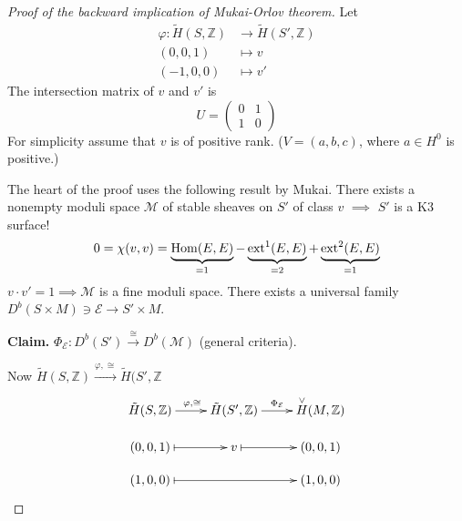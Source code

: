 \begin{proof}[Proof of the backward implication of Mukai-Orlov theorem]
Let 
\begin{align*}
\varphi: \tilde{H}(S,\mathbb{Z}) &\longrightarrow \tilde{H}(S',\mathbb{Z}) \\
(0,0,1) &\longmapsto v\\
(-1,0,0) &\longmapsto v'
\end{align*}
The intersection matrix of $v$ and $v'$ is
$$
U=\begin{pmatrix}
0&1\\ 
1&0
\end{pmatrix}
$$
For simplicity assume that $v$ is of positive rank. ($V=(a,b,c)$, where $a\in
H^0$ is positive.)

The heart of the proof uses the following result by Mukai. There exists a
nonempty moduli space $\mathcal{M}$ of stable sheaves on $S'$ of class $v$
$\implies$ $S'$ is a K3 surface!
$$
0=\chi(v,v)=\underbrace{\mathop{\mathrm{Hom}}\nolimits(E,E)}_{=1}-\underbrace{\text{ext}^1(E,E)}_{=2}
+\underbrace{\text{ext}^2(E,E)}_{=1}
$$
$v\cdot v'=1\implies \mathcal{M}$ is a fine moduli space. There exists a
universal family $D^b(S \times M)\ni \mathcal{E} \to S' \times M$.

{\bf Claim.} $\Phi_{\mathcal{E}}:D^b(S')\xrightarrow{\cong} D^b(\mathcal{M})$
(general criteria).

Now $\tilde{H}(S,\mathbb{Z})\xrightarrow{\varphi,\cong} \tilde{H}(S',\mathbb{Z}$
$$
\xymatrixrowsep{1em}
\xymatrix{
\tilde{H}(S,\mathbb{Z})\ar[r]^{\varphi,\cong}&\tilde{H}(S',\mathbb{Z})
\ar[r]^{\Phi_{\mathcal{E}}}&\overset{\vee}{H}(M,\mathbb{Z})\\
(0,0,1)\ar@{|->}[r]&  v \ar@{|->}[r]& (0,0,1)\\
(1,0,0)\ar@{|->}[rr]& & (1,0,0)
}
$$
\end{proof}


